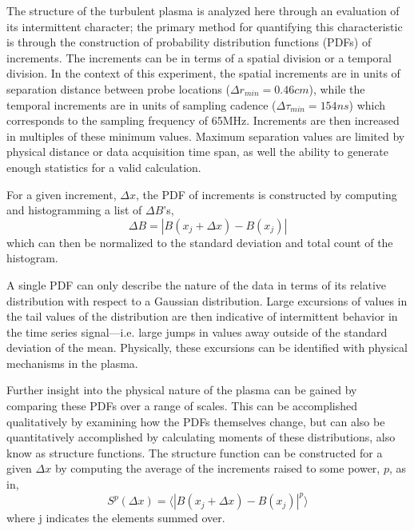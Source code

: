 \documentclass[aps,prl,amsmath,amssymb,reprint,superscriptaddress]{revtex4-1} %
\begin{document}
The structure of the turbulent plasma is analyzed here through an evaluation of its intermittent character; the primary method for quantifying this characteristic is through the construction of probability distribution functions (PDFs) of increments. The increments can be in terms of a spatial division or a temporal division. In the context of this experiment, the spatial increments are in units of separation distance between probe locations ($\Delta r_{min} = 0.46cm$), while the temporal increments are in units of sampling cadence ($\Delta \tau_{min} = 154ns$) which corresponds to the sampling frequency of 65MHz. Increments are then increased in multiples of these minimum values. Maximum separation values are limited by physical distance or data acquisition time span, as well the ability to generate enough statistics for a valid calculation.

For a given increment, $\Delta x$, the PDF of increments is constructed by computing and histogramming a list of $\Delta B$'s,
\begin{equation}
\Delta B = |B(x_{j}+\Delta x)-B(x_{j})|
\label{eq:increment}
\end{equation}
which can then be normalized to the standard deviation and total count of the histogram.

A single PDF can only describe the nature of the data in terms of its relative distribution with respect to a Gaussian distribution. Large excursions of values in the tail values of the distribution are then indicative of intermittent behavior in the time series signal---i.e. large jumps in values away outside of the standard deviation of the mean. Physically, these excursions can be identified with physical mechanisms in the plasma.

Further insight into the physical nature of the plasma can be gained by comparing these PDFs over a range of scales. This can be accomplished qualitatively by examining how the PDFs themselves change, but can also be quantitatively accomplished by calculating moments of these distributions, also know as structure functions. The structure function can be constructed for a given $\Delta x$ by computing the average of the increments raised to some power, $p$, as in,
\begin{equation}
S^{p}(\Delta x) = \langle|B(x_{j}+\Delta x)-B(x_{j})|^{p}\rangle
\label{eq:structfunc}
\end{equation}
where j indicates the elements summed over. 
\end{document}
